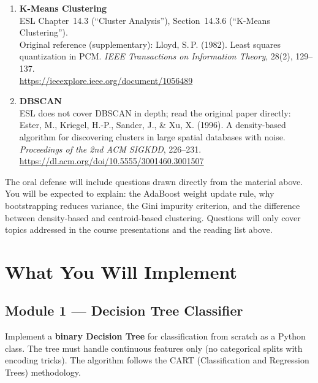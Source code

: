 \documentclass[11pt,a4paper]{article}
\begin{document}
\begin{enumerate}[topsep=2pt,itemsep=6pt,leftmargin=2.2em]
  \item \textbf{K-Means Clustering}\\
  ESL Chapter~14.3 (``Cluster Analysis''), Section~14.3.6 (``K-Means Clustering'').\\
  Original reference (supplementary): Lloyd, S.\,P. (1982). Least squares quantization in PCM. \textit{IEEE Transactions on Information
  Theory}, 28(2), 129--137.\\
  \url{https://ieeexplore.ieee.org/document/1056489}

  \item \textbf{DBSCAN}\\
  ESL does not cover DBSCAN in depth; read the original paper directly:\\
  Ester, M., Kriegel, H.-P., Sander, J., \& Xu, X. (1996). A density-based algorithm for discovering
  clusters in large spatial databases with noise. \textit{Proceedings of the 2nd ACM SIGKDD}, 226--231.\\
  \url{https://dl.acm.org/doi/10.5555/3001460.3001507}
\end{enumerate}

\begin{warnbox}
The oral defense will include questions drawn directly from the material above. You will be expected to explain: the AdaBoost weight update rule, why bootstrapping reduces variance, the Gini impurity criterion, and the difference between density-based and centroid-based clustering. Questions will only cover topics addressed in the course presentations and the reading list above.
\end{warnbox}
\section{What You Will Implement}\label{sec:impl}
\subsection{Module 1 --- Decision Tree Classifier}
Implement a \textbf{binary Decision Tree} for classification from scratch as a Python class. The tree must handle continuous features only (no categorical splits with encoding tricks). The algorithm follows the CART (Classification and Regression Trees) methodology.
\end{document}
